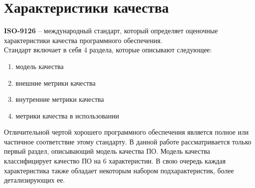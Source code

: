 \documentclass[a4paper,14pt]{extreport} %
\begin{document}
\newpage
\section{Характеристики качества}

\textbf{ISO-9126} -- международный стандарт, который определяет оценочные характеристики качества программного обеспечения\cite{ISO-9126}. \\
Стандарт включает в себя 4 раздела, которые описывают следующее:
\begin{enumerate}
\item модель качества
\item внешние метрики качества
\item внутренние метрики качества
\item метрики качества в использовании
\end{enumerate} 
Отличительной чертой хорошего программного обеспечения является полное или частичное соответствие этому стандарту.
В данной работе рассматривается только первый раздел, описывающий модель качества ПО. Модель качества классифицирует качество ПО на 6 характеристии. В свою очередь каждая характеристика также обладает некоторым набором подхарактеристик, более детализирующих ее.
\end{document}
